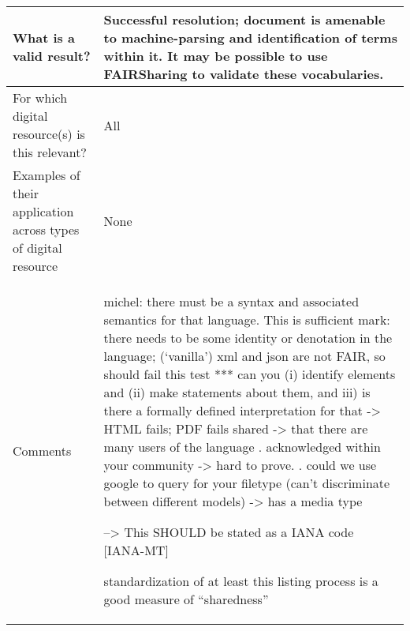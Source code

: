\documentclass[english]{article}
\begin{document}
\begin{longtable}{|p{5cm}|p{9cm}|}
\\



\hline
What is a valid result? &  



Successful resolution; document is amenable to machine-parsing and identification of terms within it.  It may be possible to use FAIRSharing to validate these vocabularies.



\\



\hline
For which digital resource(s) is this relevant? &  All\\



\hline
Examples of their application across types of digital resource &  None

\\



\hline

Comments & 

michel: there must be a syntax and associated semantics for that language.  This is sufficient \newline 
mark: there needs to be some identity or denotation in the language; (‘vanilla’) xml and json are not FAIR, so should fail this test\newline 
\newline 
*** can you (i) identify elements and (ii) make statements about them, and iii) is there a formally defined interpretation for that 
 -> HTML fails; PDF fails
\newline 
shared\newline 
-> that there are many users of the language\newline 
. acknowledged within your community\newline 
 -> hard to prove.\newline 
. could we use google to query for your filetype (can’t discriminate between different models)\newline 
-> has a media type\newline 

--> This SHOULD be stated as a IANA code [IANA-MT]\newline 


standardization of at least this listing process is a good measure of “sharedness”\newline 


\end{longtable}
\end{document}
